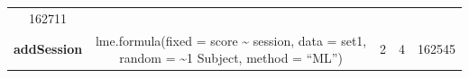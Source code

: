 \documentclass[]{article}
\begin{document}
\begin{longtable}[]{@{}ccccc@{}}
\begin{minipage}[t]{0.09\columnwidth}
162711\strut
\end{minipage}\tabularnewline
\begin{minipage}[t]{0.25\columnwidth}\centering\strut
\textbf{addSession}\strut
\end{minipage} & \begin{minipage}[t]{0.37\columnwidth}\centering\strut
lme.formula(fixed = score \textasciitilde{} session, data = set1, random
= \textasciitilde{}1 \textbar{} Subject, method = ``ML'')\strut
\end{minipage} & \begin{minipage}[t]{0.09\columnwidth}\centering\strut
2\strut
\end{minipage} & \begin{minipage}[t]{0.06\columnwidth}\centering\strut
4\strut
\end{minipage} & \begin{minipage}[t]{0.09\columnwidth}\centering\strut
162545\strut
\end{minipage}\tabularnewline
\bottomrule
\end{longtable}
\end{document}
